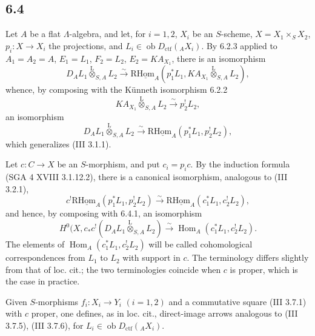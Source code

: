 \documentclass[11pt]{article}
\DeclareMathOperator{\Hom}{Hom}
\providecommand{\lten}{\overset{\mathrm L}{\otimes}}
\providecommand{\Ob}{\operatorname{ob}}
\providecommand{\Hom}{\operatorname{Hom}}
\providecommand{\lten}{\overset{\mathrm L}{\otimes}}
\providecommand{\lten}{\overset{\mathrm L}{\otimes}}
\providecommand{\Ob}{\operatorname{ob}}
\providecommand{\lten}{\overset{\mathrm L}{\otimes}}
\providecommand{\lten}{\overset{\mathrm L}{\otimes}}
\providecommand{\Ob}{\operatorname{Ob}}
\providecommand{\lten}{\overset{\mathrm L}{\otimes}}
\providecommand{\Hom}{\operatorname{Hom}}
\providecommand{\Ob}{\operatorname{ob}}
\providecommand{\Ob}{\operatorname{Ob}}
\providecommand{\lten}{\overset{\mathrm L}{\otimes}}
\begin{document}
\subsection*{6.4}
Let $A$ be a flat $\Lambda$-algebra, and let, for $i=1,2$, $X_i$ be an $S$-scheme, $X=X_1\times_SX_2$, $p_i:X\to X_i$ the projections, and $L_i\in\Ob D_{\mathrm{ctf}}({}_AX_i)$. By 6.2.3 applied to $A_1=A_2=A$, $E_1=L_1$, $F_2=L_2$, $E_2=KA_{X_1}$, there is an isomorphism
\[
D_A L_1\lten_{S,A}L_2
\xrightarrow{\sim}
\mathrm{R}\underline{\mathrm{Hom}}_A(p_1^*L_1,KA_{X_1}\lten_{S,A}L_2),
\]
whence, by composing with the Künneth isomorphism 6.2.2
\[
KA_{X_1}\lten_{S,A}L_2\xrightarrow{\sim}p_2^!L_2,
\]
an isomorphism
\begin{equation}
D_AL_1\lten_{S,A}L_2
\xrightarrow{\sim}
\mathrm{R}\underline{\mathrm{Hom}}_A(p_1^*L_1,p_2^!L_2),
\tag{6.4.1}
\end{equation}
which generalizes (III 3.1.1).

Let $c:C\to X$ be an $S$-morphism, and put $c_i=p_ic$. By the induction formula (SGA 4 XVIII 3.1.12.2), there is a canonical isomorphism, analogous to (III 3.2.1),
\begin{equation}
c^!\mathrm{R}\underline{\mathrm{Hom}}_A(p_1^*L_1,p_2^!L_2)
\xrightarrow{\sim}
\mathrm{R}\underline{\mathrm{Hom}}_A(c_1^*L_1,c_2^!L_2),
\tag{6.4.2}
\end{equation}
and hence, by composing with 6.4.1, an isomorphism
\begin{equation}
H^0(X,c_*c^!(D_AL_1\lten_{S,A}L_2)
\xrightarrow{\sim}
\Hom_A(c_1^*L_1,c_2^!L_2).
\tag{6.4.3}
\end{equation}
The elements of $\Hom_A(c_1^*L_1,c_2^!L_2)$ will be called cohomological correspondences from $L_1$ to $L_2$ with support in $c$. The terminology differs slightly from that of loc. cit.; the two terminologies coincide when $c$ is proper, which is the case in practice.

Given $S$-morphisms $f_i:X_i\to Y_i$ $(i=1,2)$ and a commutative square (III 3.7.1) with $c$ proper, one defines, as in loc. cit., direct-image arrows analogous to (III 3.7.5), (III 3.7.6), for $L_i\in\Ob D_{\mathrm{ctf}}({}_AX_i)$.
\end{document}
